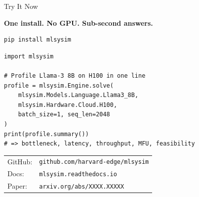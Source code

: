 \begin{frame}[fragile]{Try It Now}
\begin{center}
\Large\bfseries
One install. No GPU. Sub-second answers.
\end{center}

\vspace{1em}
\begin{lstlisting}[language=bash, backgroundcolor=\color{crimson!6}]
pip install mlsysim
\end{lstlisting}

\vspace{0.5em}
\begin{lstlisting}
import mlsysim

# Profile Llama-3 8B on H100 in one line
profile = mlsysim.Engine.solve(
    mlsysim.Models.Language.Llama3_8B,
    mlsysim.Hardware.Cloud.H100,
    batch_size=1, seq_len=2048
)
print(profile.summary())
# => bottleneck, latency, throughput, MFU, feasibility
\end{lstlisting}

\vspace{0.5em}
\centering
\small
\begin{tabular}{@{}ll@{}}
GitHub:  & \texttt{github.com/harvard-edge/mlsysim} \\
Docs:    & \texttt{mlsysim.readthedocs.io} \\
Paper:   & \texttt{arxiv.org/abs/XXXX.XXXXX} \\
\end{tabular}
\end{frame}
